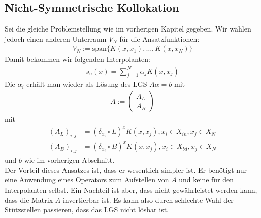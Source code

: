 \subsection{Nicht-Symmetrische Kollokation}
Sei die gleiche Problemstellung wie im vorherigen Kapitel gegeben. Wir wählen jedoch einen anderen Unterraum $V_N$ für die Ansatzfunktionen:
\begin{align*}
V_N := \text{span} \{K(x,x_1), \dots, K(x,x_N) \}
\end{align*}
Damit bekommen wir folgenden Interpolanten:
\begin{align*}
s_u(x) = \sum_{j=1}^N \alpha_j K(x,x_j)
\end{align*}
Die $\alpha_i$ erhält man wieder als Lösung des \ac{LGS} $A \alpha = b$ mit
\begin{align*}
A := \begin{pmatrix}
A_L \\ 
A_B
\end{pmatrix} 
\end{align*}
mit
\begin{align*}
(A_L)_{i,j} &= (\delta_{x_i} \circ L)^x K(x,x_j), x_i \in X_{in}, x_j \in X_N\\
(A_B)_{i,j} &= (\delta_{x_i} \circ B)^x K(x,x_j), x_i \in X_{bd}, x_j \in X_N
\end{align*}
und
$b$ wie im vorherigen Abschnitt.\\
Der Vorteil dieses Ansatzes ist, dass er wesentlich simpler ist. Er benötigt nur eine Anwendung eines Operators zum Aufstellen von $A$ und keine für den Interpolanten selbst. Ein Nachteil ist aber, dass nicht gewährleistet werden kann, dass die Matrix $A$ invertierbar ist. Es kann also durch schlechte Wahl der Stützstellen passieren, dass das \ac{LGS} nicht lösbar ist.